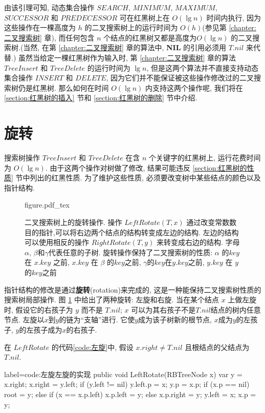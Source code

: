 \documentclass[oneside,10pt,fontset=none]{ctexbook}
\numberwithin{definition}{chapter}
\numberwithin{theorem}{chapter}
\numberwithin{lemma}{chapter}
\begin{document}
由该引理可知, 动态集合操作 $SEARCH$, $MINIMUM$, $MAXIMUM$, $SUCCESSOR$ 和 $PREDECESSOR$ 可在红黑树上在 $O(\lg{n})$ 时间内执行, 因为这些操作在一棵高度为 $h$ 的二叉搜索树上的运行时间为 $O(h)$(参见第 \ref{chapter:二叉搜索树} 章), 而任何包含 $n$ 个结点的红黑树又都是高度为$O(\lg{n})$ 的二叉搜索树.(当然, 在第 \ref{chapter:二叉搜索树} 章的算法中, \textbf{NIL} 的引用必须用 $T.nil$ 来代替.) 虽然当给定一棵红黑树作为输入时, 第 \ref{chapter:二叉搜索树} 章的算法 $TreeInsert$ 和 $TreeDelete$ 的运行时间为 $\lg{n}$, 但是这两个算法并不直接支持动态集合操作 $INSERT$ 和 $DELETE$, 因为它们并不能保证被这些操作修改过的二叉搜索树仍是红黑树. 那么如何在时间 $O(\lg{n})$ 内支持这两个操作呢, 我们将在 \ref{section:红黑树的插入} 节和 \ref{section:红黑树的删除} 节中介绍.

\section{旋转}

搜索树操作 $TreeInsert$ 和 $TreeDelete$ 在含 $n$ 个关键字的红黑树上, 运行花费时间为 $O(\lg{n})$. 由于这两个操作对树做了修改, 结果可能违反 \ref{section:红黑树的性质} 节中列出的红黑性质. 为了维护这些性质, 必须要改变树中某些结点的颜色以及指针结构.

\begin{figure}[htbp]
    \centering
    \def\svgwidth{\columnwidth}
    {figure.pdf_tex}
    \caption{二叉搜索树上的旋转操作. 操作 $LeftRotate(T, x)$ 通过改变常数数目的指针,可以将右边两个结点的结构转变成左边的结构. 左边的结构可以使用相反的操作 $RightRotate(T, y)$ 来转变成右边的结构. 字母$\alpha$, $\beta$和$\gamma$代表任意的子树. 旋转操作保持了二叉搜索树的性质: $\alpha$ 的$key$在 $x.key$ 之前, $x.key$ 在 $\beta$ 的$key$之前, $\gamma$的$key$在$y.key$之前, $y.key$ 在 $y$ 的$key$之前}
    \label{fig:左旋和右旋}
\end{figure}

指针结构的修改是通过\textbf{旋转}(rotation)来完成的, 这是一种能保持二叉搜索树性质的搜索树局部操作. 图 \ref{fig:左旋和右旋} 中给出了两种旋转: 左旋和右旋. 当在某个结点 $x$ 上做左旋时, 假设它的右孩子为 $y$ 而不是 $T.nil$; $x$ 可以为其右孩子不是$T.nil$结点的树内任意节点. 左旋以$x$到$y$的链为``支轴''进行. 它使$y$成为该子树新的根节点, $x$成为$y$的左孩子, $y$的左孩子成为$x$的右孩子.

在 $LeftRotate$ 的代码\ref{code:左旋}中, 假设 $x.right \neq T.nil$ 且根结点的父结点为 $T.nil$.

\begin{myjava}{label={code:左旋}}{左旋的实现}{}
public void LeftRotate(RBTreeNode x) {
    var y = x.right;
    x.right = y.left;
    if (y.left != nil)
        y.left.p = x;
    y.p = x.p;
    if (x.p == nil)
        root = y;
    else if (x == x.p.left)
        x.p.left = y;
    else
        x.p.right = y;
    y.left = x;
    x.p = y;
}
\end{myjava}
\end{document}
